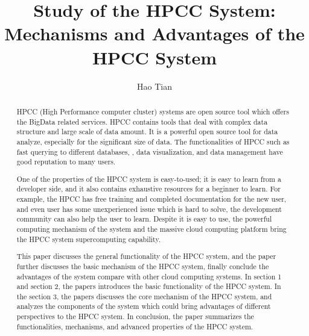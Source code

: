 
\title{Study of the HPCC System: Mechanisms and Advantages of the HPCC System}

\author{Hao Tian}


\renewcommand{\shortauthors}{H. Tian.}


\begin{abstract}
HPCC (High Performance computer cluster) systems are open source tool which offers the BigData related services. HPCC contains tools that deal with complex data structure and large scale of data amount. It is a powerful open source tool for data analyze, especially for the significant size of data. The functionalities of HPCC such as fast querying to different databases, , data visualization, and data management have good reputation to many users.

One of the properties of the HPCC system is easy-to-used; it is easy to learn from a developer side, and it also contains exhaustive resources for a beginner to learn. For example, the HPCC has free training and completed documentation for the new user, and even user has some unexperienced issue which is hard to solve, the development community can also help the user to learn. Despite it is easy to use, the powerful computing mechanism of the system and the massive cloud computing platform bring the HPCC system supercomputing capability.

This paper discusses the general functionality of the HPCC system, and the paper further discusses the basic mechanism of the HPCC system, finally conclude the advantages of the system compare with other cloud computing systems. In section 1 and section 2, the papers introduces the basic functionality of the HPCC system. In the section 3, the papers discusses the core mechanism of the HPCC system, and analyzes the components of the system which could bring advantages of different perspectives to the HPCC system. In conclusion, the paper summarizes the functionalities, mechanisms, and advanced properties of the HPCC system.
\end{abstract}


\maketitle

